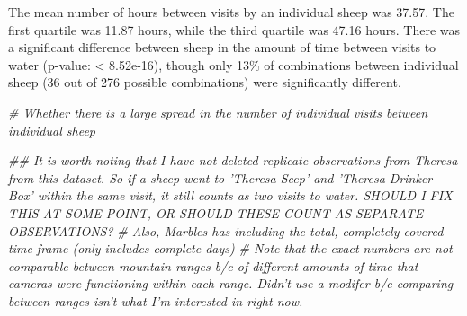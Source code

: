 \documentclass[]{article}
\newenvironment{Shaded}{\begin{snugshade}}{\end{snugshade}}
\newcommand{\CommentTok}[1]{\textcolor[rgb]{0.56,0.35,0.01}{\textit{#1}}}
\begin{document}
The mean number of hours between visits by an individual sheep was
37.57. The first quartile was 11.87 hours, while the third quartile was
47.16 hours. There was a significant difference between sheep in the
amount of time between visits to water (p-value: \textless{} 8.52e-16),
though only 13\% of combinations between individual sheep (36 out of 276
possible combinations) were significantly different.

\begin{Shaded}
\begin{Highlighting}[]
\CommentTok{# Whether there is a large spread in the number of individual visits between individual sheep}

\CommentTok{## It is worth noting that I have not deleted replicate observations from Theresa from this dataset. So if a sheep went to 'Theresa Seep' and 'Theresa Drinker Box' within the same visit, it still counts as two visits to water. SHOULD I FIX THIS AT SOME POINT, OR SHOULD THESE COUNT AS SEPARATE OBSERVATIONS?}
\CommentTok{# Also, Marbles has including the total, completely covered time frame (only includes complete days)}
\CommentTok{# Note that the exact numbers are not comparable between mountain ranges b/c of different amounts of time that cameras were functioning within each range. Didn't use a modifer b/c comparing between ranges isn't what I'm interested in right now.}


\end{Highlighting}
\end{Shaded}
\end{document}
